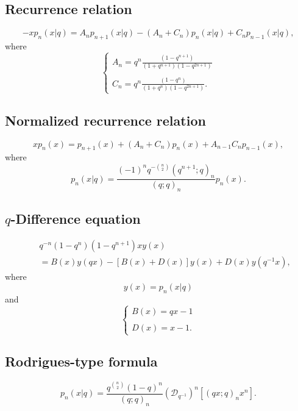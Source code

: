 \documentclass[envcountchap,graybox]{svmono}
\begin{document}
\subsection*{Recurrence relation}
\begin{equation}
\label{RecLittleqLegendre}
-xp_n(x|q)=A_np_{n+1}(x|q)-\left(A_n+C_n\right)p_n(x|q)+C_np_{n-1}(x|q),
\end{equation}
where
$$\left\{\begin{array}{l}
\displaystyle A_n=q^n\frac{(1-q^{n+1})}{(1+q^{n+1})(1-q^{2n+1})}\\
\\
\displaystyle C_n=q^n\frac{(1-q^n)}{(1+q^n)(1-q^{2n+1})}.
\end{array}\right.$$

\subsection*{Normalized recurrence relation}
\begin{equation}
\label{NormRecLittleqLegendre}
xp_n(x)=p_{n+1}(x)+(A_n+C_n)p_n(x)+A_{n-1}C_np_{n-1}(x),
\end{equation}
where
$$p_n(x|q)=\frac{(-1)^nq^{-\binom{n}{2}}(q^{n+1};q)_n}{(q;q)_n}p_n(x).$$

\subsection*{$q$-Difference equation}
\begin{eqnarray}
\label{dvLittleqLegendre}
& &q^{-n}(1-q^n)(1-q^{n+1})xy(x)\nonumber\\
& &{}=B(x)y(qx)-\left[B(x)+D(x)\right]y(x)+D(x)y(q^{-1}x),
\end{eqnarray}
where
$$y(x)=p_n(x|q)$$
and
$$\left\{\begin{array}{l}\displaystyle B(x)=qx-1\\
\\
\displaystyle D(x)=x-1.\end{array}\right.$$

\subsection*{Rodrigues-type formula}
\begin{equation}
\label{RodLittleqLegendre}
p_n(x|q)=\frac{q^{\binom{n}{2}}(1-q)^n}{(q;q)_n}
\left(\mathcal{D}_{q^{-1}}\right)^n\left[(qx;q)_nx^n\right].
\end{equation}
\end{document}
